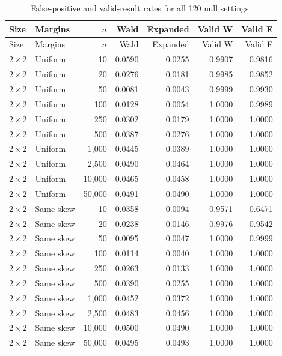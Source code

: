 \begin{longtable}{@{}llrrrrr@{}}
\caption{False-positive and valid-result rates for all 120 null settings.}\label{tab:all-main-null}\\
\toprule Size & Margins & \(n\) & Wald & Expanded & Valid W & Valid E\\\midrule\endfirsthead
\toprule Size & Margins & \(n\) & Wald & Expanded & Valid W & Valid E\\\midrule\endhead
\(2\times2\) & Uniform & 10 & 0.0590 & 0.0255 & 0.9907 & 0.9816\\
\(2\times2\) & Uniform & 20 & 0.0276 & 0.0181 & 0.9985 & 0.9852\\
\(2\times2\) & Uniform & 50 & 0.0081 & 0.0043 & 0.9999 & 0.9930\\
\(2\times2\) & Uniform & 100 & 0.0128 & 0.0054 & 1.0000 & 0.9989\\
\(2\times2\) & Uniform & 250 & 0.0302 & 0.0179 & 1.0000 & 1.0000\\
\(2\times2\) & Uniform & 500 & 0.0387 & 0.0276 & 1.0000 & 1.0000\\
\(2\times2\) & Uniform & 1,000 & 0.0445 & 0.0389 & 1.0000 & 1.0000\\
\(2\times2\) & Uniform & 2,500 & 0.0490 & 0.0464 & 1.0000 & 1.0000\\
\(2\times2\) & Uniform & 10,000 & 0.0465 & 0.0458 & 1.0000 & 1.0000\\
\(2\times2\) & Uniform & 50,000 & 0.0491 & 0.0490 & 1.0000 & 1.0000\\
\(2\times2\) & Same skew & 10 & 0.0358 & 0.0094 & 0.9571 & 0.6471\\
\(2\times2\) & Same skew & 20 & 0.0238 & 0.0146 & 0.9976 & 0.9542\\
\(2\times2\) & Same skew & 50 & 0.0095 & 0.0047 & 1.0000 & 0.9999\\
\(2\times2\) & Same skew & 100 & 0.0114 & 0.0040 & 1.0000 & 1.0000\\
\(2\times2\) & Same skew & 250 & 0.0263 & 0.0133 & 1.0000 & 1.0000\\
\(2\times2\) & Same skew & 500 & 0.0390 & 0.0255 & 1.0000 & 1.0000\\
\(2\times2\) & Same skew & 1,000 & 0.0452 & 0.0372 & 1.0000 & 1.0000\\
\(2\times2\) & Same skew & 2,500 & 0.0483 & 0.0456 & 1.0000 & 1.0000\\
\(2\times2\) & Same skew & 10,000 & 0.0500 & 0.0490 & 1.0000 & 1.0000\\
\(2\times2\) & Same skew & 50,000 & 0.0495 & 0.0493 & 1.0000 & 1.0000\\

\end{longtable}
